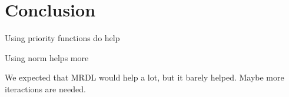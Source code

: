 \section{Conclusion}

Using priority functions do help

Using norm helps more

We expected that MRDL would help a lot, but it barely helped. Maybe more iteractions are needed.

%
%
%
